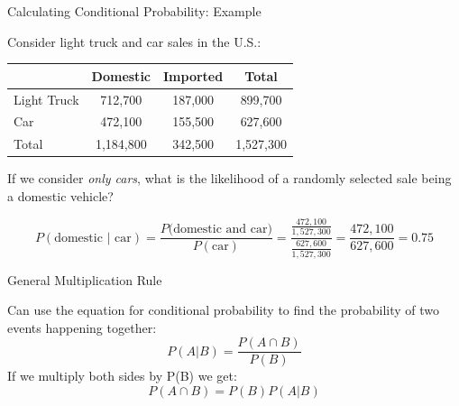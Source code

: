 \documentclass{beamer}
\begin{document}
\begin{frame}{Calculating Conditional Probability: Example}
	
	Consider light truck and car sales in the U.S.:

	\begin{center}
		\begin{tabular}{|l|c|c|c|}
			\hline
			& \textbf{Domestic} & \textbf{Imported} & \textbf{Total} \\ \hline \hline
			Light Truck & 712,700 & 187,000 & 899,700 \\ \hline 
			Car & 472,100 & 155,500 & 627,600 \\ \hline 
			Total & 1,184,800 & 342,500 & 1,527,300 \\ \hline
		\end{tabular}
	\end{center}
		
	If we consider \textit{only cars}, what is the likelihood of a randomly selected sale being a domestic vehicle?

	\small{\[
		P(\text{domestic } \vert \text{ car}) = \frac{P(\text{domestic and car)}}{P(\text{car})} = \frac{\frac{472,100}{1,527,300}}{\frac{627,600}{1,527,300}}=\frac{472,100}{627,600}=0.75
	\]}
	
\end{frame}

\begin{frame}{General Multiplication Rule}
	
	Can use the equation for conditional probability to find the probability of two events happening together:
	$$P(A|B)=\frac{P(A\cap B)}{P(B)}$$
	If we multiply both sides by P(B) we get:
	$$P(A\cap B)=P(B)P(A|B)$$
	
\end{frame}

\end{document}
